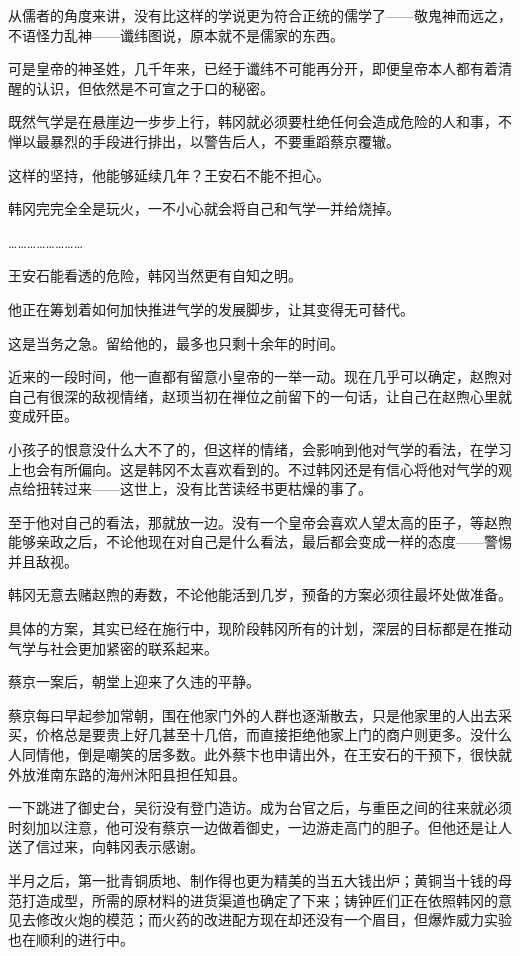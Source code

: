 从儒者的角度来讲，没有比这样的学说更为符合正统的儒学了——敬鬼神而远之，不语怪力乱神——谶纬图说，原本就不是儒家的东西。

可是皇帝的神圣姓，几千年来，已经于谶纬不可能再分开，即便皇帝本人都有着清醒的认识，但依然是不可宣之于口的秘密。

既然气学是在悬崖边一步步上行，韩冈就必须要杜绝任何会造成危险的人和事，不惮以最暴烈的手段进行排出，以警告后人，不要重蹈蔡京覆辙。

这样的坚持，他能够延续几年？王安石不能不担心。

韩冈完完全全是玩火，一不小心就会将自己和气学一并给烧掉。

……………………

王安石能看透的危险，韩冈当然更有自知之明。

他正在筹划着如何加快推进气学的发展脚步，让其变得无可替代。

这是当务之急。留给他的，最多也只剩十余年的时间。

近来的一段时间，他一直都有留意小皇帝的一举一动。现在几乎可以确定，赵煦对自己有很深的敌视情绪，赵顼当初在禅位之前留下的一句话，让自己在赵煦心里就变成歼臣。

小孩子的恨意没什么大不了的，但这样的情绪，会影响到他对气学的看法，在学习上也会有所偏向。这是韩冈不太喜欢看到的。不过韩冈还是有信心将他对气学的观点给扭转过来——这世上，没有比苦读经书更枯燥的事了。

至于他对自己的看法，那就放一边。没有一个皇帝会喜欢人望太高的臣子，等赵煦能够亲政之后，不论他现在对自己是什么看法，最后都会变成一样的态度——警惕并且敌视。

韩冈无意去赌赵煦的寿数，不论他能活到几岁，预备的方案必须往最坏处做准备。

具体的方案，其实已经在施行中，现阶段韩冈所有的计划，深层的目标都是在推动气学与社会更加紧密的联系起来。

蔡京一案后，朝堂上迎来了久违的平静。

蔡京每曰早起参加常朝，围在他家门外的人群也逐渐散去，只是他家里的人出去采买，价格总是要贵上好几甚至十几倍，而直接拒绝他家上门的商户则更多。没什么人同情他，倒是嘲笑的居多数。此外蔡卞也申请出外，在王安石的干预下，很快就外放淮南东路的海州沐阳县担任知县。

一下跳进了御史台，吴衍没有登门造访。成为台官之后，与重臣之间的往来就必须时刻加以注意，他可没有蔡京一边做着御史，一边游走高门的胆子。但他还是让人送了信过来，向韩冈表示感谢。

半月之后，第一批青铜质地、制作得也更为精美的当五大钱出炉；黄铜当十钱的母范打造成型，所需的原材料的进货渠道也确定了下来；铸钟匠们正在依照韩冈的意见去修改火炮的模范；而火药的改进配方现在却还没有一个眉目，但爆炸威力实验也在顺利的进行中。

